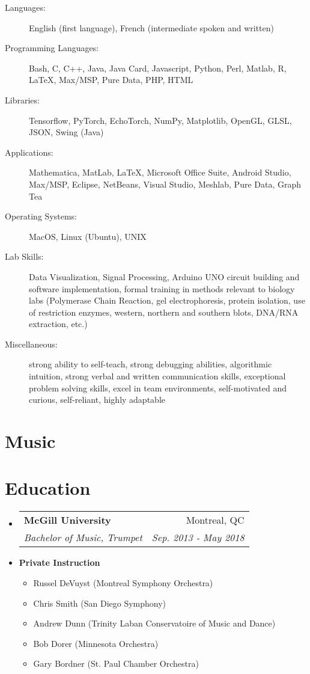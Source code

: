 \documentclass[letterpaper,11pt]{article}
\makeatletter
\newcommand{\resitem}[1]{\item #1 \vspace{-2pt}}
\newcommand{\ressubheading}[4]{
\begin{tabular*}{6.1in}{l@{\extracolsep{\fill}}r}
		\textbf{#1} & #2 \\
		\textit{#3} & \textit{#4} \\
\end{tabular*}\vspace{-1pt}}
\makeatother
\begin{document}
\begin{description}
\item[Languages:]
English (first language), French (intermediate spoken and written)

\item[Programming Languages:]
Bash, C, C++, Java, Java Card, Javascript, Python, Perl, Matlab, R, \LaTeX, Max/MSP, Pure Data, PHP, HTML

\item[Libraries:]
Tensorflow, PyTorch, EchoTorch, NumPy, Matplotlib, OpenGL, GLSL, JSON, Swing (Java)

\item[Applications:]
Mathematica, MatLab, \LaTeX, Microsoft Office Suite, Android Studio, Max/MSP, Eclipse, NetBeans, Visual Studio, Meshlab, Pure Data, Graph Tea

\item[Operating Systems:]
MacOS, Linux (Ubuntu), UNIX

\item[Lab Skills:]
Data Visualization, Signal Processing, Arduino UNO circuit building and software implementation, formal training in methods relevant to biology labs (Polymerase Chain Reaction, gel electrophoresis, protein isolation, use of restriction enzymes, western, northern and southern blots, DNA/RNA extraction, etc.)

\item[Miscellaneous:]
strong ability to self-teach, strong debugging abilities, algorithmic intuition, strong verbal and written communication skills, exceptional problem solving skills, excel in team environments, self-motivated and curious, self-reliant, highly adaptable
\end{description}

\newpage
\section*{\textbf{\huge{Music}}}

\section*{Education}
\begin{itemize}

\item
	\ressubheading{McGill University}{Montreal, QC}{Bachelor of Music, Trumpet}{Sep. 2013 - May 2018}

\item	
	\textbf{Private Instruction}
	\begin{itemize}
	    \resitem{Russel DeVuyst (Montreal Symphony Orchestra)}
	    \resitem{Chris Smith (San Diego Symphony)}
	    \resitem{Andrew Dunn (Trinity Laban Conservatoire of Music and Dance)}
	    \resitem{Bob Dorer (Minnesota Orchestra)} 
	    \resitem{Gary Bordner (St. Paul Chamber Orchestra)}
	\end{itemize}
	
\end{itemize}
\end{document}
